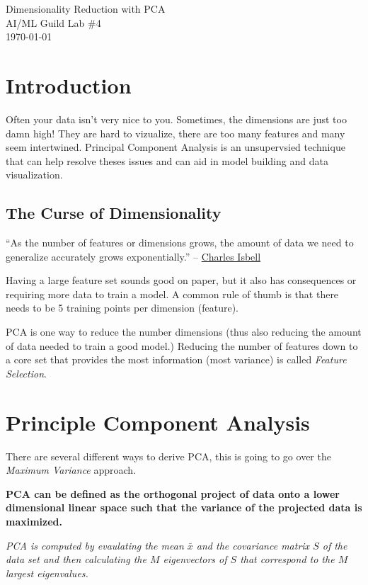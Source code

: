 \documentclass[letterpaper,12pt]{article}
\begin{document}
\begin{flushleft}
Dimensionality Reduction with PCA\\
AI/ML Guild Lab \#4\\
\today \\
\end{flushleft}

\section{Introduction}

Often your data isn't very nice to you. Sometimes, the dimensions are just too
damn high! They are hard to vizualize, there are too many features and many seem
intertwined. Principal Component Analysis is an unsupervsied technique that can
help resolve theses issues and can aid in model building and data visualization.

\subsection{The Curse of Dimensionality}

``As the number of features or dimensions grows, the amount of data we need to
generalize accurately grows exponentially.''
-- \href{https://www.cc.gatech.edu/people/charles-isbell}{Charles Isbell}

Having a large feature set sounds good on paper, but it also has consequences or
requiring more data to train a model. A common rule of thumb is that there needs
to be 5 training points per dimension (feature).

PCA is one way to reduce the number dimensions (thus also reducing the amount of
data needed to train a good model.) Reducing the number of features down to a
core set that provides the most information (most variance) is called
\emph{Feature Selection}.

\section{Principle Component Analysis}

There are several different ways to derive PCA, this is going to go over the
\emph{Maximum Variance} approach.

\textbf{PCA can be defined as the orthogonal project of data onto a lower dimensional
linear space such that the variance of the projected data is maximized.}

\emph{PCA is computed by evaulating the mean $\bar{x}$ and the
covariance matrix $S$ of the data set and then calculating the $M$ eigenvectors
of $S$ that correspond to the $M$ largest eigenvalues.}
\end{document}
